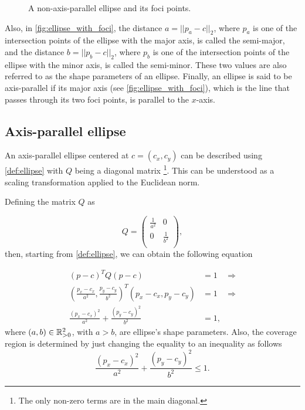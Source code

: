 \begin{figure}[H]
    \centering
    
    \caption{A non-axis-parallel ellipse and its foci points.}
    
    \fautor
    \label{fig:ellipse_with_foci}
\end{figure}

Also, in \autoref{fig:ellipse_with_foci}, the distance $a = ||p_a - c||_2$, where $p_a$ is one of the intersection points of the ellipse with the major axis, is called the semi-major, and the distance $b = ||p_b-c||_2$, where $p_b$ is one of the intersection points of the ellipse with the minor axis, is called the semi-minor. These two values are also referred to as the shape parameters of an ellipse.
Finally, an ellipse is said to be axis-parallel if its major axis (see \autoref{fig:ellipse_with_foci}), which is the line that passes through its two foci points, is parallel to the $x$-axis.

\subsection{Axis-parallel ellipse}

An axis-parallel ellipse centered at $c = (c_x,c_y)$ can be described using \autoref{def:ellipse} with $Q$ being a diagonal matrix \footnote{The only non-zero terms are in the main diagonal.}. This can be understood as a scaling transformation applied to the Euclidean norm.

Defining the matrix $Q$ as

\[
Q=
\left( {\begin{array}{cc}
    \frac{1}{a^2} & 0 \\
    0 & \frac{1}{b^2} \\
    \end{array} } \right),
\]
then, starting from \autoref{def:ellipse}, we can obtain the following equation

 \begin{align}\label{equation:pellipse}
 (p-c)^{T}Q(p-c) &= 1 & \Rightarrow \nonumber \\
 (\frac{p_x-c_x}{a^2}, \frac{p_y-c_y}{b^2})^{T}(p_x-c_x, p_y-c_y) &= 1 & \Rightarrow \nonumber\\
  \frac{(p_x-c_x)^2}{a^2} + \frac{(p_y-c_y)^2}{b^2} &= 1,&
 \end{align}
where $(a, b) \in \mathbb{R}^2_{>0}$, with $a>b$, are ellipse's shape parameters.
Also, the coverage region is determined by just changing the equality to an inequality as follows
\begin{equation}\label{equation:cover_pellipse}
\frac{(p_x-c_x)^2}{a^2} + \frac{(p_y-c_y)^2}{b^2} \le 1.
\end{equation}

